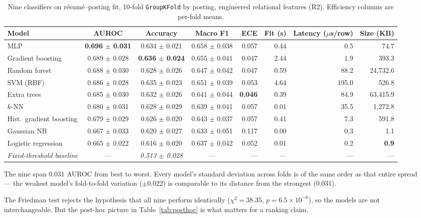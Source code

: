 \documentclass[11pt]{article}                      %
\newcommand{\tabfont}{\footnotesize}
\begin{document}
\begin{table}[t]
\centering\tabfont
\caption{Nine classifiers on résumé--posting fit, 10-fold \texttt{GroupKFold} by
posting, engineered relational features (R2). Efficiency columns are per-fold
means.}
\label{tab:main}
\begin{tabular}{lcccrrrr}
\toprule
Model & AUROC & Accuracy & Macro F1 & ECE & Fit (s) & Latency ($\mu$s/row) & Size (KB) \\
\midrule
MLP                     & \textbf{0.696 $\pm$ 0.031} & 0.634 $\pm$ 0.021 & 0.658 $\pm$ 0.038 & 0.057 & 0.44 & 0.5 & 74.7 \\
Gradient boosting       & 0.689 $\pm$ 0.028 & \textbf{0.636 $\pm$ 0.024} & 0.655 $\pm$ 0.041 & 0.047 & 2.44 & 1.9 & 393.3 \\
Random forest           & 0.688 $\pm$ 0.030 & 0.628 $\pm$ 0.026 & 0.647 $\pm$ 0.042 & 0.047 & 0.59 & 88.2 & 24{,}732.6 \\
SVM (RBF)               & 0.686 $\pm$ 0.028 & 0.635 $\pm$ 0.023 & 0.651 $\pm$ 0.039 & 0.053 & 4.64 & 195.0 & 526.8 \\
Extra trees             & 0.685 $\pm$ 0.030 & 0.632 $\pm$ 0.026 & 0.641 $\pm$ 0.044 & \textbf{0.046} & 0.39 & 84.9 & 63{,}415.9 \\
$k$-NN                  & 0.680 $\pm$ 0.031 & 0.628 $\pm$ 0.029 & 0.639 $\pm$ 0.041 & 0.057 & 0.01 & 35.5 & 1{,}272.8 \\
Hist.\ gradient boosting & 0.679 $\pm$ 0.029 & 0.626 $\pm$ 0.020 & 0.643 $\pm$ 0.037 & 0.057 & 0.41 & 7.3 & 591.8 \\
Gaussian NB             & 0.667 $\pm$ 0.033 & 0.620 $\pm$ 0.027 & 0.633 $\pm$ 0.051 & 0.117 & 0.00 & 0.3 & 1.1 \\
Logistic regression     & 0.665 $\pm$ 0.022 & 0.616 $\pm$ 0.020 & 0.637 $\pm$ 0.042 & 0.052 & 0.01 & 0.2 & \textbf{0.9} \\
\midrule
\textit{Fixed-threshold baseline} & --- & \textit{0.513 $\pm$ 0.028} & --- & --- & --- & --- & --- \\
\bottomrule
\end{tabular}
\end{table}

The nine span 0.031 AUROC from best to worst. Every model's standard deviation
across folds is of the same order as that entire spread --- the weakest model's
fold-to-fold variation ($\pm 0.022$) is comparable to its distance from the
strongest (0.031).

The Friedman test rejects the hypothesis that all nine perform identically
($\chi^2 = 38.35$, $p = 6.5 \times 10^{-6}$), so the models are not
interchangeable. But the post-hoc picture in Table~\ref{tab:posthoc} is what
matters for a ranking claim.
\end{document}
